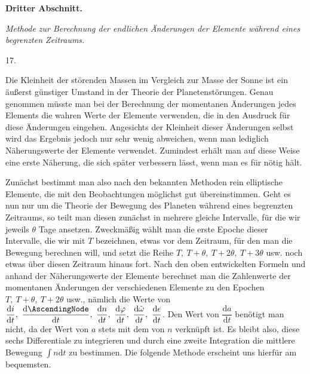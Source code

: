 \par{}\bigskip
{}
\begin{center}
{\large\bfseries Dritter Abschnitt.\par}
\medskip
\textit{Methode zur Berechnung der endlichen Änderungen der Elemente während eines begrenzten Zeitraums.}
\end{center}
\begin{center}17.\end{center}
\noindent\hspace*{\parindent}Die Kleinheit der störenden Massen im Vergleich zur Masse der Sonne ist ein äußerst günstiger Umstand in der Theorie der Planetenstörungen. Genau genommen müsste man bei der Berechnung der momentanen Änderungen jedes Elements die wahren Werte der Elemente verwenden, die in den Ausdruck für diese Änderungen eingehen. Angesichts der Kleinheit dieser Änderungen selbst wird das Ergebnis jedoch nur sehr wenig abweichen, wenn man lediglich Näherungswerte der Elemente verwendet. Zumindest erhält man auf diese Weise eine erste Näherung, die sich später verbessern lässt, wenn man es für nötig hält.
\par Zunächst bestimmt man also nach den bekannten Methoden rein elliptische Elemente, die mit den Beobachtungen möglichst gut übereinstimmen. Geht es nun nur um die Theorie der Bewegung des Planeten während eines begrenzten Zeitraums, so teilt man diesen zunächst in mehrere gleiche Intervalle, für die wir jeweils \(\theta\) Tage ansetzen. Zweckmäßig wählt man die erste Epoche dieser Intervalle, die wir mit \(T\) bezeichnen, etwas vor dem Zeitraum, für den man die Bewegung berechnen will, und setzt die Reihe \(T,\ T+\theta,\ T+2\theta,\ T+3\theta\) usw. noch etwas über diesen Zeitraum hinaus fort. Nach den oben entwickelten Formeln und anhand der Näherungswerte der Elemente berechnet man die Zahlenwerte der momentanen Änderungen der verschiedenen Elemente zu den Epochen \(T,\ T+\theta,\ T+2\theta\) usw., nämlich die Werte von \(\dfrac{\mathrm{d}i}{\mathrm{d}t},\ \dfrac{\mathrm{d}\AscendingNode}{\mathrm{d}t},\ \dfrac{\mathrm{d}n}{\mathrm{d}t},\ \dfrac{\mathrm{d}\varphi}{\mathrm{d}t},\ \dfrac{\mathrm{d}\tilde\omega}{\mathrm{d}t},\ \dfrac{\mathrm{d}\epsilon}{\mathrm{d}t}\). Den Wert von \(\dfrac{\mathrm{d}a}{\mathrm{d}t}\) benötigt man nicht, da der Wert von \(a\) stets mit dem von \(n\) verknüpft ist. Es bleibt also, diese sechs Differentiale zu integrieren und durch eine zweite Integration die mittlere Bewegung \(\int n\mathrm{d}t\) zu bestimmen. Die folgende Methode erscheint uns hierfür am bequemsten.
